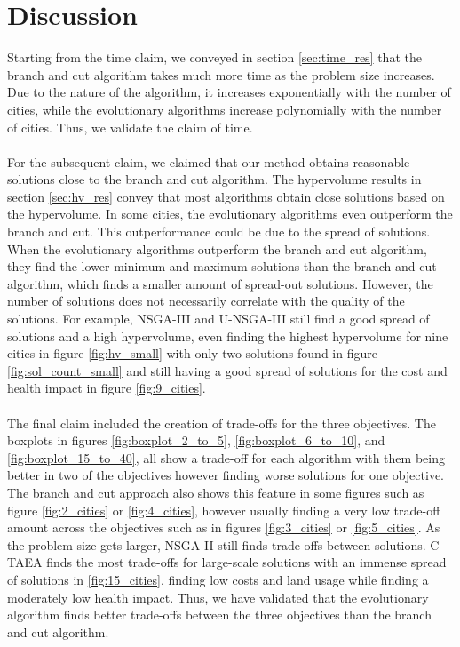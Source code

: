 \documentclass[mscthesis, 11pt]{usiinfthesis}
\theoremstyle{newdefinition}
\begin{document}
\section{Discussion}
Starting from the time claim, we conveyed in section \ref{sec:time_res} that the branch and cut algorithm takes much more time as the problem size increases. Due to the nature of the algorithm, it increases exponentially with the number of cities, while the evolutionary algorithms increase polynomially with the number of cities. Thus, we validate the claim of time.
\\\\
For the subsequent claim, we claimed that our method obtains reasonable solutions close to the branch and cut algorithm. The hypervolume results in section \ref{sec:hv_res} convey that most algorithms obtain close solutions based on the hypervolume. In some cities, the evolutionary algorithms even outperform the branch and cut. This outperformance could be due to the spread of solutions. When the evolutionary algorithms outperform the branch and cut algorithm, they find the lower minimum and maximum solutions than the branch and cut algorithm, which finds a smaller amount of spread-out solutions. However, the number of solutions does not necessarily correlate with the quality of the solutions. 
For example, NSGA-III and U-NSGA-III still find a good spread of solutions and a high hypervolume, even finding the highest hypervolume for nine cities in figure \ref{fig:hv_small} with only two solutions found in figure \ref{fig:sol_count_small} and still having a good spread of solutions for the cost and health impact in figure \ref{fig:9_cities}. 
\\\\
The final claim included the creation of trade-offs for the three objectives. The boxplots in figures \ref{fig:boxplot_2_to_5}, \ref{fig:boxplot_6_to_10}, and \ref{fig:boxplot_15_to_40}, all show a trade-off for each algorithm with them being better in two of the objectives however finding worse solutions for one objective. The branch and cut approach also shows this feature in some figures such as figure \ref{fig:2_cities} or \ref{fig:4_cities}, however usually finding a very low trade-off amount across the objectives such as in figures \ref{fig:3_cities} or \ref{fig:5_cities}. As the problem size gets larger, NSGA-II still finds trade-offs between solutions. C-TAEA finds the most trade-offs for large-scale solutions with an immense spread of solutions in \ref{fig:15_cities}, finding low costs and land usage while finding a moderately low health impact. Thus, we have validated that the evolutionary algorithm finds better trade-offs between the three objectives than the branch and cut algorithm.
\end{document}
